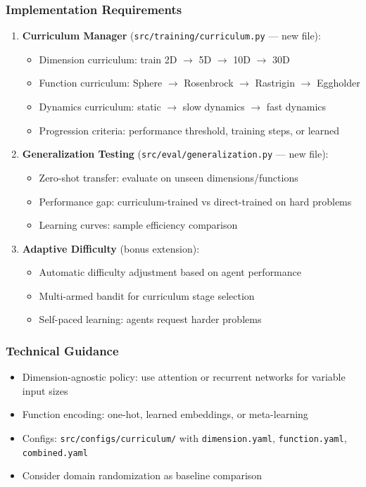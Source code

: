 \documentclass[11pt,a4paper]{scrartcl}
\newcommand{\codepath}[1]{\colorbox{codehighlight}{\texttt{#1}}}
\begin{document}
\subsubsection*{Implementation Requirements}
\begin{enumerate}[leftmargin=1.4em]
    \item \textbf{Curriculum Manager} (\codepath{src/training/curriculum.py} --- new file):
    \begin{itemize}
        \item Dimension curriculum: train 2D $\rightarrow$ 5D $\rightarrow$ 10D $\rightarrow$ 30D
        \item Function curriculum: Sphere $\rightarrow$ Rosenbrock $\rightarrow$ Rastrigin $\rightarrow$ Eggholder
        \item Dynamics curriculum: static $\rightarrow$ slow dynamics $\rightarrow$ fast dynamics
        \item Progression criteria: performance threshold, training steps, or learned
    \end{itemize}
    
    \item \textbf{Generalization Testing} (\codepath{src/eval/generalization.py} --- new file):
    \begin{itemize}
        \item Zero-shot transfer: evaluate on unseen dimensions/functions
        \item Performance gap: curriculum-trained vs direct-trained on hard problems
        \item Learning curves: sample efficiency comparison
    \end{itemize}
    
    \item \textbf{Adaptive Difficulty} (bonus extension):
    \begin{itemize}
        \item Automatic difficulty adjustment based on agent performance
        \item Multi-armed bandit for curriculum stage selection
        \item Self-paced learning: agents request harder problems
    \end{itemize}
\end{enumerate}

\subsubsection*{Technical Guidance}
\begin{itemize}
    \item Dimension-agnostic policy: use attention or recurrent networks for variable input sizes
    \item Function encoding: one-hot, learned embeddings, or meta-learning
    \item Configs: \codepath{src/configs/curriculum/} with \texttt{dimension.yaml}, \texttt{function.yaml}, \texttt{combined.yaml}
    \item Consider domain randomization as baseline comparison
\end{itemize}
\end{document}
